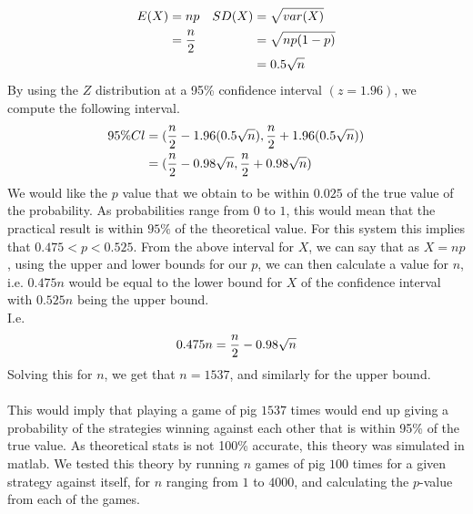 \documentclass[a4paper,titlepage]{article}
\begin{document}
\begin{align}
E(X) &= np & SD(X) &= \sqrt{var(X)}\notag\\
&= \dfrac{n}{2} & &= \sqrt{np(1-p)}\notag\\
& & &= 0.5\sqrt{n} \notag
\end{align}
By using the $Z$ distribution at a 95\% confidence interval $(z=1.96)$, we compute the following interval. 
\begin{align}
95\%Cl &= (\dfrac{n}{2} -1.96(0.5\sqrt{n}), \dfrac{n}{2} +1.96(0.5\sqrt{n}))\notag\\
&= (\dfrac{n}{2}-0.98\sqrt{n}, \dfrac{n}{2}+0.98\sqrt{n})
\notag
\end{align}
We would like the $p$ value that we obtain to be within $0.025$ of the true value of the probability. As probabilities range from $0$ to $1$, this would mean that the practical result is within $95\%$ of the theoretical value. For this system this implies that $0.475<p<0.525$. From the above interval for $X$, we can say that as $X=np$, using the upper and lower bounds for our $p$, we can then calculate a value for $n$, i.e. $0.475n$ would be equal to the lower bound for $X$ of the confidence interval with $0.525n$ being the upper bound.\\
I.e.
\begin{equation}
0.475n=\dfrac{n}{2}-0.98\sqrt{n}
\notag
\end{equation}
Solving this for $n$, we get that $n=1537$, and similarly for the upper bound.\\ \\
This would imply that playing a game of pig $1537$ times would end up giving a probability of the strategies winning against each other that is within 95\% of the true value. As theoretical stats is not 100\% accurate, this theory was simulated in matlab. We tested this theory by running $n$ games of pig $100$ times for a given strategy against itself, for $n$ ranging from $1$ to $4000$, and calculating the $p$-value from each of the games.\\ \\
\end{document}
